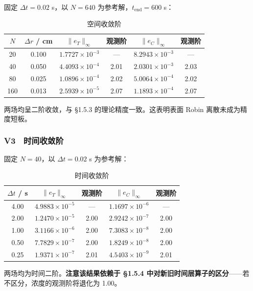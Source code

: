 \documentclass[12pt,a4paper]{ctexart}
\begin{document}
固定 $\Delta t=0.02$ s，以 $N=640$ 为参考解，$t_{\text{end}}=600$ s：

\begin{table}[H]
\centering
\caption{空间收敛阶}
\begin{tabular}{cccccc}
\toprule
$N$ & $\Delta r$ / cm & $\|e_T\|_\infty$ & 观测阶 & $\|e_C\|_\infty$ & 观测阶 \\
\midrule
20 & 0.100 & $1.7727\times10^{-3}$ & — & $8.2943\times10^{-3}$ & — \\
40 & 0.050 & $4.4093\times10^{-4}$ & 2.01 & $2.0301\times10^{-3}$ & 2.03 \\
80 & 0.025 & $1.0896\times10^{-4}$ & 2.02 & $5.0064\times10^{-4}$ & 2.02 \\
160 & 0.013 & $2.5939\times10^{-5}$ & 2.07 & $1.1893\times10^{-4}$ & 2.07 \\
\bottomrule
\end{tabular}
\end{table}

两场均呈二阶收敛，与 §1.5.3 的理论精度一致。这表明表面 Robin 离散未成为精度短板。

\subsubsection*{V3　时间收敛阶}

固定 $N=40$，以 $\Delta t=0.02$ s 为参考解：

\begin{table}[H]
\centering
\caption{时间收敛阶}
\begin{tabular}{ccccc}
\toprule
$\Delta t$ / s & $\|e_T\|_\infty$ & 观测阶 & $\|e_C\|_\infty$ & 观测阶 \\
\midrule
4.00 & $4.9883\times10^{-5}$ & — & $1.1697\times10^{-6}$ & — \\
2.00 & $1.2470\times10^{-5}$ & 2.00 & $2.9242\times10^{-7}$ & 2.00 \\
1.00 & $3.1166\times10^{-6}$ & 2.00 & $7.3083\times10^{-8}$ & 2.00 \\
0.50 & $7.7829\times10^{-7}$ & 2.00 & $1.8249\times10^{-8}$ & 2.00 \\
0.25 & $1.9371\times10^{-7}$ & 2.01 & $4.5403\times10^{-9}$ & 2.01 \\
\bottomrule
\end{tabular}
\end{table}

两场均为时间二阶。\textbf{注意该结果依赖于 §1.5.4 中对新旧时间层算子的区分}——若不区分，浓度的观测阶将退化为 1.00。
\end{document}

